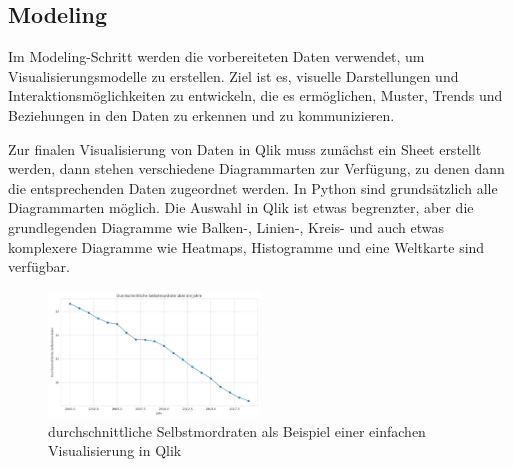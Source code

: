 \documentclass[12pt]{article}
\begin{document}
	
	\subsection{Modeling}
	Im Modeling-Schritt werden die vorbereiteten Daten verwendet, um Visualisierungsmodelle zu erstellen. Ziel ist es, visuelle Darstellungen und Interaktionsmöglichkeiten zu entwickeln, die es ermöglichen, Muster, Trends und Beziehungen in den Daten zu erkennen und zu kommunizieren.
	
	Zur finalen Visualisierung von Daten in Qlik muss zunächst ein Sheet erstellt werden, dann stehen verschiedene Diagrammarten zur Verfügung, zu denen dann die entsprechenden Daten zugeordnet werden.
	In Python sind grundsätzlich alle Diagrammarten möglich. Die Auswahl in Qlik ist etwas begrenzter, aber die grundlegenden Diagramme wie Balken-, Linien-, Kreis- und auch etwas komplexere Diagramme wie Heatmaps, Histogramme und eine Weltkarte sind verfügbar. 
	\begin{figure}[h]
		\centering
		\includegraphics[width=0.5\textwidth]{easy_linechart}
		\caption{durchschnittliche Selbstmordraten als Beispiel einer einfachen Visualisierung in Qlik}
	\end{figure}
	
\end{document}
